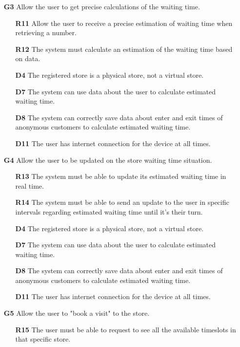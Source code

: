\begin{enumerate}
\begin{enumerate}
	\end{enumerate}
	\item [\textbf{G3}] Allow the user to get precise calculations of the waiting time.
	\begin{enumerate}
		\item [\textbf{R11}] Allow the user to receive a precise estimation of waiting time when retrieving a number.
		\item [\textbf{R12}] The system must calculate an estimation of the waiting time based on data.
		\item [\textbf{D4}] The registered store is a physical store, not a virtual store.
		\item [\textbf{D7}] The system can use data about the user to calculate estimated waiting time.
		\item [\textbf{D8}] The system can correctly save data about enter and exit times of anonymous customers to calculate estimated waiting time.
		\item [\textbf{D11}] The user has internet connection for the device at all times.
	\end{enumerate}
	\item [\textbf{G4}] Allow the user to be updated on the store waiting time situation.
	\begin{enumerate}
		\item [\textbf{R13}] The system must be able to update its estimated waiting time in real time.
		\item [\textbf{R14}] The system must be able to send an update to the user in specific intervals regarding estimated waiting time until it's their turn.
		\item [\textbf{D4}] The registered store is a physical store, not a virtual store.
		\item [\textbf{D7}] The system can use data about the user to calculate estimated waiting time.
		\item [\textbf{D8}] The system can correctly save data about enter and exit times of anonymous customers to calculate estimated waiting time.
		\item [\textbf{D11}] The user has internet connection for the device at all times.
	\end{enumerate}
	\item [\textbf{G5}] Allow the user to "book a visit" to the store.
	\begin{enumerate}
			\item [\textbf{R15}] The user must be able to request to see all the available timeslots in that specific store.

\end{enumerate}
\end{enumerate}
